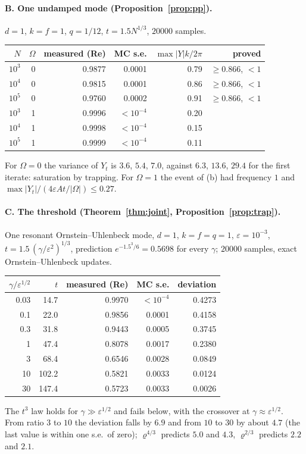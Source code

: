 \documentclass[11pt]{article}
\newcommand{\eps}{\varepsilon}
\newcommand{\rhoeff}{\varrho}
\theoremstyle{remark}
\begin{document}
\paragraph{B. One undamped mode (Proposition~\ref{prop:pp}).} $d=1$,
$k=f=1$, $q=1/12$, $t = 1.5N^{1/3}$, $20000$ samples.
\begin{center}
\begin{tabular}{rrrrrr}
  $N$ & $\Omega$ & measured (Re) & MC s.e. & $\max|Y|k/2\pi$ &
  proved \\ \hline
  $10^3$ & 0 & 0.9877 & 0.0001 & 0.79 & $\ge0.866$, $<1$ \\
  $10^4$ & 0 & 0.9815 & 0.0001 & 0.86 & $\ge0.866$, $<1$ \\
  $10^5$ & 0 & 0.9760 & 0.0002 & 0.91 & $\ge0.866$, $<1$ \\
  $10^3$ & 1 & 0.9996 & $<10^{-4}$ & 0.20 & \\
  $10^4$ & 1 & 0.9998 & $<10^{-4}$ & 0.15 & \\
  $10^5$ & 1 & 0.9999 & $<10^{-4}$ & 0.11 & \\
\end{tabular}
\end{center}
For $\Omega=0$ the variance of $Y_t$ is $3.6$, $5.4$, $7.0$, against
$6.3$, $13.6$, $29.4$ for the first iterate: saturation by trapping. For
$\Omega=1$ the event of (b) had frequency $1$ and
$\max|Y_t|/(4\eps At/|\Omega|)\le0.27$.

\paragraph{C. The threshold (Theorem~\ref{thm:joint},
Proposition~\ref{prop:trap}).} One resonant Ornstein--Uhlenbeck mode,
$d=1$, $k=f=q=1$, $\eps = 10^{-3}$, $t = 1.5\,(\gamma/\eps^2)^{1/3}$,
prediction $e^{-1.5^3/6} = 0.5698$ for every $\gamma$; $20000$ samples,
exact Ornstein--Uhlenbeck updates.
\begin{center}
\begin{tabular}{rrrrr}
  $\gamma/\eps^{1/2}$ & $t$ & measured (Re) & MC s.e. & deviation \\ \hline
  0.03 & 14.7 & 0.9970 & $<10^{-4}$ & 0.4273 \\
  0.1 & 22.0 & 0.9856 & 0.0001 & 0.4158 \\
  0.3 & 31.8 & 0.9443 & 0.0005 & 0.3745 \\
  1 & 47.4 & 0.8078 & 0.0017 & 0.2380 \\
  3 & 68.4 & 0.6546 & 0.0028 & 0.0849 \\
  10 & 102.2 & 0.5821 & 0.0033 & 0.0124 \\
  30 & 147.4 & 0.5723 & 0.0033 & 0.0026 \\
\end{tabular}
\end{center}
The $t^3$ law holds for $\gamma\gg\eps^{1/2}$ and fails below, with the
crossover at $\gamma\approx\eps^{1/2}$. From ratio $3$ to $10$ the deviation
falls by $6.9$ and from $10$ to $30$ by about $4.7$ (the last value is
within one s.e.\ of zero); $\rhoeff^{4/3}$ predicts $5.0$ and $4.3$,
$\rhoeff^{2/3}$ predicts $2.2$ and $2.1$.
\end{document}
